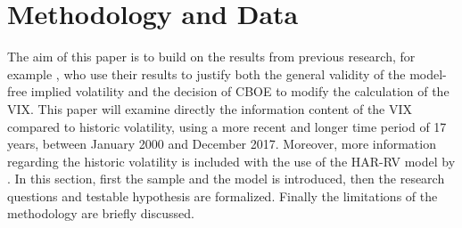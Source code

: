 
\section{Methodology and Data}\label{sec:4MethodData}
The aim of this paper is to build on the results from previous research, for example \textcite{jiang2003}, who use their results to justify both the general validity of the model-free implied volatility and the decision of \ac{CBOE} to modify the calculation of the \ac{VIX}. This paper will examine directly the information content of the \ac{VIX} compared to historic volatility, using a more recent and longer time period of 17 years, between January 2000 and December 2017. Moreover, more information regarding the historic volatility is included with the use of the HAR-RV model by \textcite{corsi2009}. In this section, first the sample and the model is introduced, then the research questions and testable hypothesis are formalized. Finally the limitations of the methodology are briefly discussed.

